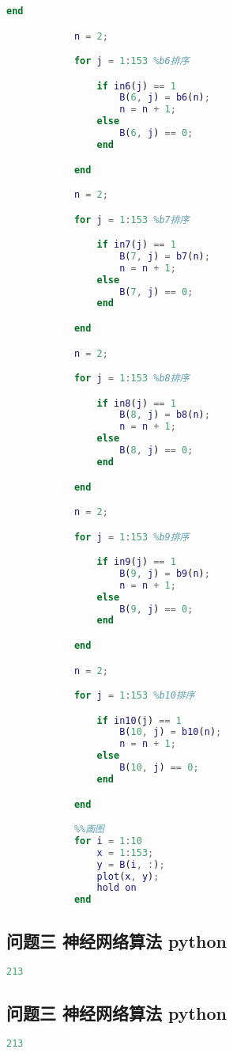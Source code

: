 \begin{appendices}
\begin{lstlisting}[language=matlab]
            end

            n = 2;

            for j = 1:153 %b6排序

                if in6(j) == 1
                    B(6, j) = b6(n);
                    n = n + 1;
                else
                    B(6, j) == 0;
                end

            end

            n = 2;

            for j = 1:153 %b7排序

                if in7(j) == 1
                    B(7, j) = b7(n);
                    n = n + 1;
                else
                    B(7, j) == 0;
                end

            end

            n = 2;

            for j = 1:153 %b8排序

                if in8(j) == 1
                    B(8, j) = b8(n);
                    n = n + 1;
                else
                    B(8, j) == 0;
                end

            end

            n = 2;

            for j = 1:153 %b9排序

                if in9(j) == 1
                    B(9, j) = b9(n);
                    n = n + 1;
                else
                    B(9, j) == 0;
                end

            end

            n = 2;

            for j = 1:153 %b10排序

                if in10(j) == 1
                    B(10, j) = b10(n);
                    n = n + 1;
                else
                    B(10, j) == 0;
                end

            end

            %%画图
            for i = 1:10
                x = 1:153;
                y = B(i, :);
                plot(x, y);
                hold on
            end
        \end{lstlisting}    

        \subsection{问题三 神经网络算法 python}
        \begin{lstlisting}[language=python]
            213
        \end{lstlisting}

        \subsection{问题三 神经网络算法 python}
        \begin{lstlisting}[language=python]
            213
        \end{lstlisting}
        
    \end{appendices}
    